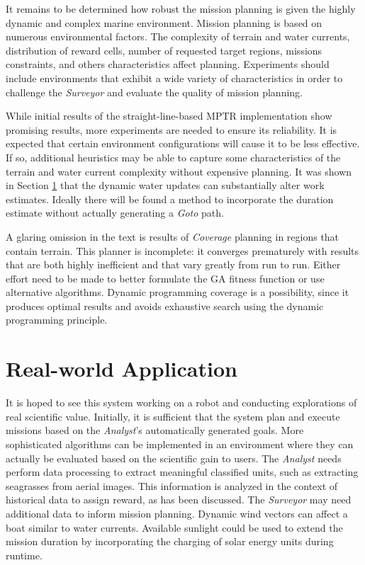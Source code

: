\documentclass{tamuccthesis}
\begin{document}
It remains to be determined how robust the mission planning is given the highly dynamic and complex marine environment. Mission planning is based on numerous environmental factors. The complexity of terrain and water currents, distribution of reward cells, number of requested target regions, missions constraints, and others characteristics affect planning. Experiments should include environments that exhibit a wide variety of characteristics in order to challenge the \textit{Surveyor} and evaluate the quality of mission planning. 

While initial results of the straight-line-based MPTR implementation show promising results, more experiments are needed to ensure its reliability. It is expected that certain environment configurations will cause it to be less effective. If so, additional heuristics may be able to capture some characteristics of the terrain and water current complexity without expensive planning. It was shown in Section \ref{} that the dynamic water updates can substantially alter work estimates. Ideally there will be found a method to incorporate the duration estimate without actually generating a \textit{Goto} path. 

A glaring omission in the text is results of \textit{Coverage} planning in regions that contain terrain. This planner is incomplete: it converges prematurely with results that are both highly inefficient and that vary greatly from run to run. Either effort need to be made to better formulate the GA fitness function or use alternative algorithms. Dynamic programming coverage is a possibility, since it produces optimal results and avoids exhaustive search using the dynamic programming principle. 

\section{Real-world Application}

It is hoped to see this system working on a robot and conducting explorations of real scientific value. Initially, it is sufficient that the system plan and execute missions based on the \textit{Analyst}'s automatically generated goals. More sophisticated algorithms can be implemented in an environment where they can actually be evaluated based on the scientific gain to users. The \textit{Analyst} needs perform data processing to extract meaningful classified units, such as extracting seagrasses from aerial images. This information is analyzed in the context of historical data to assign reward, as has been discussed. The \textit{\textit{Surveyor}} may need additional data to inform mission planning. Dynamic wind vectors can affect a boat similar to water currents. Available sunlight could be used to extend the mission duration by incorporating the charging of solar energy units during runtime.  
\end{document}
